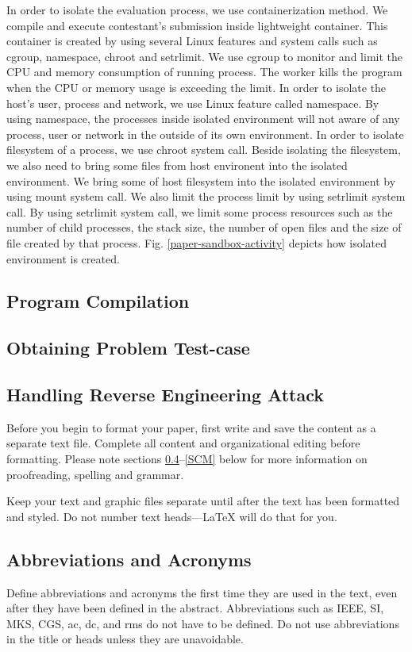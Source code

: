 \documentclass[conference]{IEEEtran}
\begin{document}
In order to isolate the evaluation process, we use containerization method. We compile and execute contestant's submission inside lightweight container. This container is created by using several Linux features and system calls such as cgroup, namespace, chroot and setrlimit. We use cgroup to monitor and limit the CPU and memory consumption of running process. The worker kills the program when the CPU or memory usage is exceeding the limit. In order to isolate the host's user, process and network, we use Linux feature called namespace. By using namespace, the processes inside isolated environment will not aware of any process, user or network in the outside of its own environment. In order to isolate filesystem of a process, we use chroot system call. Beside isolating the filesystem, we also need to bring some files from host environent into the isolated environment. We bring some of host filesystem into the isolated environment by using mount system call. We also limit the process limit by using setrlimit system call. By using setrlimit system call, we limit some process resources such as the number of child processes, the stack size, the number of open files and the size of file created by that process. Fig. \ref{paper-sandbox-activity} depicts how isolated environment is created.

\subsection{Program Compilation}
\subsection{Obtaining Problem Test-case}
\subsection{Handling Reverse Engineering Attack}

Before you begin to format your paper, first write and save the content as a 
separate text file. Complete all content and organizational editing before 
formatting. Please note sections \ref{AA}--\ref{SCM} below for more information on 
proofreading, spelling and grammar.

Keep your text and graphic files separate until after the text has been 
formatted and styled. Do not number text heads---{\LaTeX} will do that 
for you.

\subsection{Abbreviations and Acronyms}\label{AA}
Define abbreviations and acronyms the first time they are used in the text, 
even after they have been defined in the abstract. Abbreviations such as 
IEEE, SI, MKS, CGS, ac, dc, and rms do not have to be defined. Do not use 
abbreviations in the title or heads unless they are unavoidable.
\end{document}
